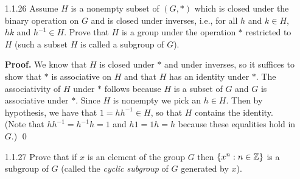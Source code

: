 \begin{enumerate}
      \textbf{Proof.} Let $G$ be a group. Suppose that $x^2 = 1$ for all
      $x \in G$. We want to show that $G$ is abelian; that is, we want to show 
      that $xy = yx$ for all $x, y \in G$. So let $x, y \in G$. By hypothesis, 
      we have that $x^2 = e$, $y^2 = e$, and $(xy)^2 = e$, so that according to 
      Proposition 2, we must have that $x = x^{-1}$, $y = y^{-1}$, and
      $xy = (xy)^{-1}$. Thus
      \begin{align*}
         xy &= (xy)^{-1}      &[\text{By Hypothesis}] \\
            &= y^{-1}x^{-1}   &[\text{Proposition 1}] \\
            &= yx.
      \end{align*}
      Thus $G$ is abelian. \qed
   \item[1.1.26]  Assume $H$ is a nonempty subset of $(G, *)$ which is closed 
                  under the binary operation on $G$ and is closed under
                  inverses, i.e., for all $h$ and
                  $k \in H$, $hk$ and $h^{-1} \in H$. Prove that $H$ is a group 
                  under the operation $*$ restricted to $H$ (such a subset $H$
                  is called a subgroup of $G$).

      \textbf{Proof.} We know that $H$ is closed under $*$ and under inverses, 
      so it suffices to show that $*$ is associative on $H$ and that $H$ has an 
      identity under $*$. The associativity of $H$ under $*$ follows because $H$ 
      is a subset of $G$ and $G$ is associative under $*$. Since $H$ is nonempty
      we pick an $h \in H$. Then by hypothesis, we have that
      $1 = hh^{-1} \in H$, so that $H$ contains the identity. (Note that
      $hh^{-1} = h^{-1}h = 1$ and $h1 = 1h = h$ because these equalities hold in
      $G$.) \qed
   \item[1.1.27]  Prove that if $x$ is an element of the group $G$ then
                  $\{x^n : n \in \mathbb{Z}\}$ is a subgroup of $G$ (called the
                  \textit{cyclic subgroup} of $G$ generated by $x$).


\end{enumerate}
